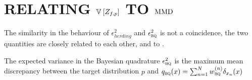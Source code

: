 \documentclass[]{article}
\begin{document}

\section{RELATING $\mathbb{V}_{} \left[ {Z_{f,p}} \right]$ TO ${\rm MMD}$}

The similarity in the behaviour of $\epsilon^{2}_{herding}$ and $\epsilon^{2}_{{\textsc{bq}}{}}$ is not a coincidence, the two quantities are closely related to each other, and to \mmd.

\begin{prop} The expected variance in the Bayesian quadrature $\epsilon^{2}_{{\textsc{bq}}{}}$  is the maximum mean discrepancy between the target distribution $p$ and $q_{{\textsc{bq}}{}}(x) = \sum_{n=1}^{N}w^{(n)}_{{\textsc{bq}}{}}\delta_{x_n}(x)$
\end{prop}
%
\end{document}
